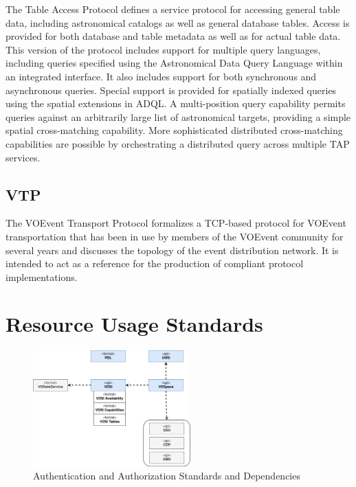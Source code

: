 \documentclass[11pt,a4paper]{ivoa}
\begin{document}
The Table Access Protocol defines a service protocol for accessing general table data, 
including astronomical catalogs as well as general database tables. Access is provided 
for both database and table metadata as well as for actual table data. This version of 
the protocol includes support for multiple query languages, including queries specified 
using the Astronomical Data Query Language within an integrated interface. It also 
includes support for both synchronous and asynchronous queries. Special support is 
provided for spatially indexed queries using the spatial extensions in ADQL. A multi-position 
query capability permits queries against an arbitrarily large list of astronomical targets, 
providing a simple spatial cross-matching capability. More sophisticated distributed 
cross-matching capabilities are possible by orchestrating a distributed query across 
multiple TAP services. 

\subsection{VTP}

The VOEvent Transport Protocol formalizes a TCP-based protocol for VOEvent transportation 
that has been in use by members of the VOEvent community for several years and discusses 
the topology of the event distribution network. It is intended to act as a reference for 
the production of compliant protocol implementations. 

\section{Resource Usage Standards}

\begin{figure}[h]
\centering
\includegraphics[width=0.54\textwidth]{ivoa-arch-gws.png}
\caption{Authentication and Authorization Standards and Dependencies}
\label{fig:gwsdeps}
\end{figure}
\end{document}
